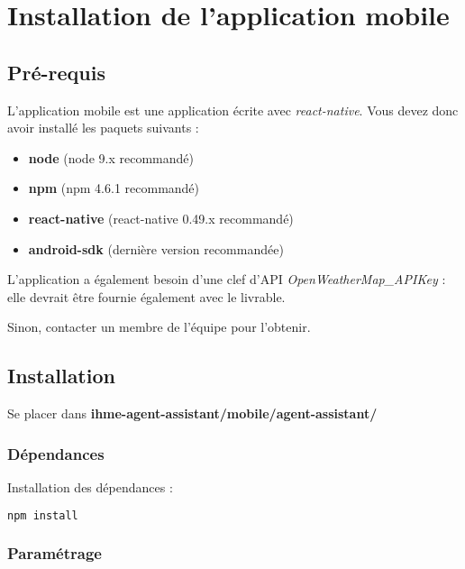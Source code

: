 \chapter{Installation de l'application mobile}

\section{Pré-requis}
L'application mobile est une application écrite avec \emph{react-native}. Vous devez donc avoir installé les paquets suivants :
\begin{itemize}
\item \textbf{node} (node 9.x recommandé)
\item \textbf{npm} (npm 4.6.1 recommandé)
\item \textbf{react-native} (react-native 0.49.x recommandé)
\item \textbf{android-sdk} (dernière version recommandée)\\
\end{itemize}


L'application a également besoin d'une clef d'API \og \emph{OpenWeatherMap\_APIKey} \fg{} : elle devrait être fournie également avec le livrable. 

Sinon, contacter un membre de l'équipe pour l'obtenir.

\section{Installation}

Se placer dans \textbf{ihme-agent-assistant/mobile/agent-assistant/}

\subsection{Dépendances}

Installation des dépendances :
\begin{lstlisting}[language=bash]
  npm install
\end{lstlisting}

\subsection{Paramétrage}

